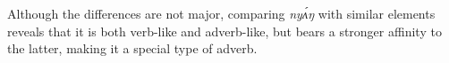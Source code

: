 \documentclass[output=paper,modfonts,nonflat,
hidelinks
]{langsci/langscibook}
\begin{document}
\noindent Although the differences are not major, comparing \textit{ny\'{ʌ}ŋ} with similar elements reveals that it is both verb-like and adverb-like, but bears a stronger affinity to the latter, making it a special type of adverb.







\end{document}
